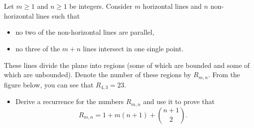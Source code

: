 \documentclass[12pt]{article}
\begin{document}

\begin{question} \\ \\
Let $m \geq 1$ and $n \geq 1$ be integers. Consider $m$ horizontal lines 
and $n$ non-horizontal lines such that  
\begin{itemize} 
\item no two of the non-horizontal lines are parallel, 
\item no three of the $m+n$ lines intersect in one single point. 
\end{itemize} 
These lines divide the plane into regions (some of which are bounded and 
some of which are unbounded). Denote the number of these regions by 
$R_{m,n}$. From the figure below, you can see that $R_{4,3} = 23$. 


\begin{itemize} 
\item Derive a recurrence for the numbers $R_{m,n}$ and use it to prove 
      that 
      \[ R_{m,n} = 1 + m(n+1) + {{n+1} \choose 2} .  
      \] 
\end{itemize} 
\end{question}

\end{document}
